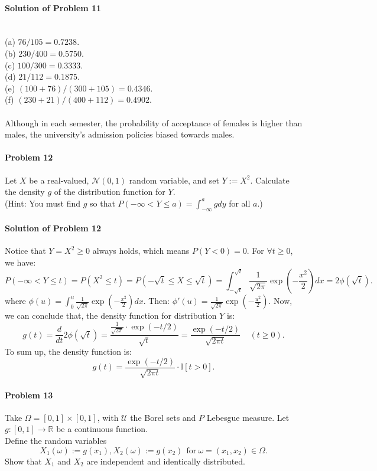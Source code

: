 \documentclass{article}
\begin{document}
\paragraph{Solution of Problem 11} ~\\
(a) $76/105 = 0.7238$.\\
(b) $230/400 = 0.5750$.\\
(c) $100/300 = 0.3333$.\\
(d) $21/112 = 0.1875$.\\
(e) $(100+76)/(300+105) = 0.4346$.\\
(f) $(230+21)/(400+112) = 0.4902$.\\
~\\
Although in each semester, the probability of acceptance of females is higher than males, the university's admission policies biased towards males.

\paragraph{Problem 12} Let $X$ be a real-valued, $\mathcal N(0,1)$ random variable, and set $Y:=X^2.$ Calculate the density $g$ of the distribution function for $Y$. \\
(Hint: You must find $g$ so that $P(-\infty<Y\leqslant a)=\int_{-\infty}^{a}gdy $ for all $a$.)

\paragraph{Solution of Problem 12} Notice that $Y=X^2 \geqslant 0$ always holds, which means $P(Y<0)=0$. For $\forall t\geqslant 0$, we have:
\[P(-\infty<Y\leqslant t)=P(X^2\leqslant t)=P(-\sqrt{t}\leqslant X\leqslant \sqrt{t})=\int_{-\sqrt{t}}^{\sqrt{t}}\frac{1}{\sqrt{2\pi}}\exp\left(-\frac{x^2}{2}\right)dx = 2\phi(\sqrt{t}).\]
where $\phi(u)=\int_{0}^{u}\frac{1}{\sqrt{2\pi}}\exp\left(-\frac{x^2}{2}\right)dx$. Then: $\phi'(u)=\frac{1}{\sqrt{2\pi}}\exp\left(-\frac{u^2}{2}\right)$. Now, we can conclude that, the density function for distribution $Y$ is:
\[g(t)=\frac{d}{dt}2\phi(\sqrt{t})= \frac{\frac{1}{\sqrt{2\pi}}\cdot\exp(-t/2)}{\sqrt{t}}=\frac{\exp(-t/2)}{\sqrt{2\pi t}}~~~~~(t\geqslant 0).\]
To sum up, the density function is:
\[g(t)=\frac{\exp(-t/2)}{\sqrt{2\pi t}}\cdot\mathbb{I}[t>0].\]


\paragraph{Problem 13} Take $\Omega = [0,1]\times [0,1]$, with $\mathcal U$ the Borel sets and $P$ Lebesgue measure. Let $g:[0,1]\rightarrow\mathbb{R}$ be a continuous function.\\
Define the random variables 
\[X_1(\omega):=g(x_1), X_2(\omega):=g(x_2)~~\text{for}~\omega=(x_1,x_2)\in\Omega.\]
Show that $X_1$ and $X_2$ are independent and identically distributed. 
\end{document}
